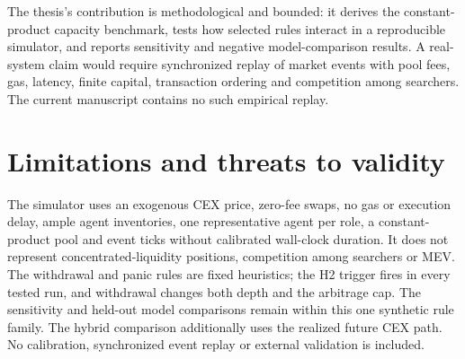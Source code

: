 The thesis's contribution is methodological and bounded: it derives the constant-product capacity benchmark, tests how selected rules interact in a reproducible simulator, and reports sensitivity and negative model-comparison results. A real-system claim would require synchronized replay of market events with pool fees, gas, latency, finite capital, transaction ordering and competition among searchers. The current manuscript contains no such empirical replay.

\section{Limitations and threats to validity}

The simulator uses an exogenous CEX price, zero-fee swaps, no gas or execution delay, ample agent inventories, one representative agent per role, a constant-product pool and event ticks without calibrated wall-clock duration. It does not represent concentrated-liquidity positions, competition among searchers or MEV. The withdrawal and panic rules are fixed heuristics; the H2 trigger fires in every tested run, and withdrawal changes both depth and the arbitrage cap. The sensitivity and held-out model comparisons remain within this one synthetic rule family. The hybrid comparison additionally uses the realized future CEX path. No calibration, synchronized event replay or external validation is included.
